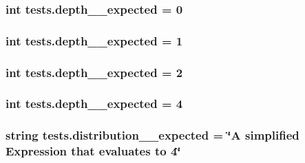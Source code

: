 \subsubsection[{depth\+\_\+1\+\_\+expected}]{\setlength{\rightskip}{0pt plus 5cm}int tests.\+depth\+\_\+\_\+expected = 0}\label{namespacetests_ace0d3b9c40d408671c0564c236a60f96}
\hypertarget{namespacetests_aecfdfc44efea714a24eac9a168acb28c}{}
\subsubsection[{depth\+\_\+2\+\_\+expected}]{\setlength{\rightskip}{0pt plus 5cm}int tests.\+depth\+\_\+\_\+expected = 1}\label{namespacetests_aecfdfc44efea714a24eac9a168acb28c}
\hypertarget{namespacetests_a5309d131cd043036f4d4bb0978560ffb}{}
\subsubsection[{depth\+\_\+3\+\_\+expected}]{\setlength{\rightskip}{0pt plus 5cm}int tests.\+depth\+\_\+\_\+expected = 2}\label{namespacetests_a5309d131cd043036f4d4bb0978560ffb}
\hypertarget{namespacetests_a7bcc68cb7c037783d18f13dbac431f79}{}
\subsubsection[{depth\+\_\+4\+\_\+expected}]{\setlength{\rightskip}{0pt plus 5cm}int tests.\+depth\+\_\+\_\+expected = 4}\label{namespacetests_a7bcc68cb7c037783d18f13dbac431f79}
\hypertarget{namespacetests_a7eb27246e80d01e52ba180333c6ea32b}{}
\subsubsection[{distribution\+\_\+1\+\_\+expected}]{\setlength{\rightskip}{0pt plus 5cm}string tests.\+distribution\+\_\+\_\+expected = \char`\"{}A simplified {\bf Expression} that evaluates to 4\char`\"{}}\label{namespacetests_a7eb27246e80d01e52ba180333c6ea32b}
\hypertarget{namespacetests_a1697cfb257a399ad17adc3d1416b835b}{}
